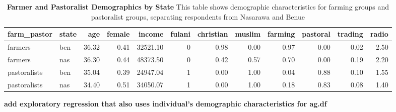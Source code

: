 \documentclass[
]{article}
\begin{document}
\begin{table}[H]
\begin{center}
\label{tab:demo_tab_state1}
\caption{\textbf{Farmer and Pastoralist Demographics by State} This table shows demographic characteristics for farming groups and pastoralist groups, separating respondents from Nasarawa and Benue}
\smallskip

\begin{tabular}{l|l|r|r|r|r|r|r|r|r|r|r}
\hline
farm\_pastor & state & age & female & income & fulani & christian & muslim & farming & pastoral & trading & radio\\
\hline
farmers & ben & 36.32 & 0.41 & 32521.10 & 0 & 0.98 & 0.00 & 0.97 & 0.00 & 0.02 & 2.50\\
\hline
farmers & nas & 36.30 & 0.44 & 48373.50 & 0 & 0.42 & 0.57 & 0.70 & 0.00 & 0.19 & 2.20\\
\hline
pastoralists & ben & 35.04 & 0.39 & 24947.04 & 1 & 0.00 & 1.00 & 0.04 & 0.88 & 0.10 & 1.55\\
\hline
pastoralists & nas & 34.40 & 0.51 & 34050.07 & 1 & 0.00 & 1.00 & 0.18 & 0.83 & 0.08 & 1.40\\
\hline
\end{tabular}


\end{center}
\end{table}

\textbf{add exploratory regression that also uses individual's
demographic characteristics for ag.df}
\end{document}
